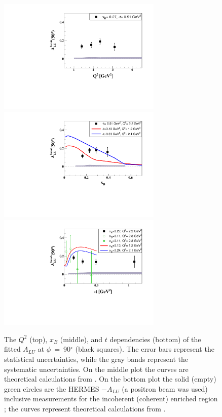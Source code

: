 \documentclass[twocolumn,nofootinbib,prl,superscriptaddress,secnumarabic,amssymb,nobibnotes,aps,floatfix]{revtex4}
\begin{document}
\begin{figure}[tb]
\includegraphics[width=7.8cm]{ALU_90_p_vs_Q2_shortscenrario.pdf}
\includegraphics[width=7.8cm]{ALU_90_p_vs_x_shortscenrario.pdf}
\includegraphics[width=7.8cm]{ALU_90_p_vs_t_shortscenrario.pdf}
\caption{The $Q^{2}$ (top), $x_{B}$ (middle), and $t$ dependencies (bottom) of
   the fitted $A_{LU}$ at $\phi$~=~90$^{\circ}$ (black squares). The error bars 
   represent the statistical uncertainties, while the gray bands represent the 
   systematic uncertainties. On the middle plot the curves are theoretical 
   calculations from \cite{simonetta_2}. On the bottom plot the solid (empty) 
   green circles are the HERMES $-A_{LU}$ (a positron beam was used) inclusive 
   measurements for the incoherent (coherent) enriched region 
   \cite{Airapetian:2009cga}; the curves represent theoretical calculations 
   from \cite{simonetta_2}.  } \label{fig:alu90}
\end{figure}
\end{document}
